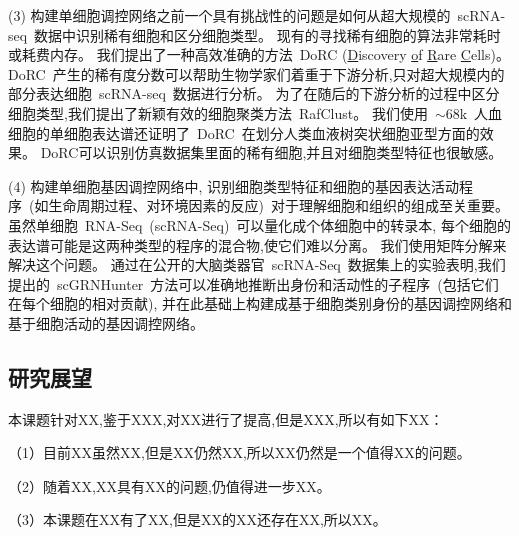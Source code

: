 (3) 构建单细胞调控网络之前一个具有挑战性的问题是如何从超大规模的~scRNA-seq~数据中识别稀有细胞和区分细胞类型。
现有的寻找稀有细胞的算法非常耗时或耗费内存。
我们提出了一种高效准确的方法~DoRC (\underline{D}iscovery \underline{o}f \underline{R}are \underline{C}ells)。
DoRC~产生的稀有度分数可以帮助生物学家们着重于下游分析,只对超大规模内的部分表达细胞~scRNA-seq~数据进行分析。
为了在随后的下游分析的过程中区分细胞类型,我们提出了新颖有效的细胞聚类方法~RafClust。
我们使用~${\sim}68$k~人血细胞的单细胞表达谱还证明了~DoRC~在划分人类血液树突状细胞亚型方面的效果。
DoRC可以识别仿真数据集里面的稀有细胞,并且对细胞类型特征也很敏感。

(4) 构建单细胞基因调控网络中, 识别细胞类型特征和细胞的基因表达活动程序~(如生命周期过程、对环境因素的反应)~对于理解细胞和组织的组成至关重要。
虽然单细胞~RNA-Seq~(scRNA-Seq)~可以量化成个体细胞中的转录本,
每个细胞的表达谱可能是这两种类型的程序的混合物,使它们难以分离。
我们使用矩阵分解来解决这个问题。
通过在公开的大脑类器官~scRNA-Seq~数据集上的实验表明,我们提出的~scGRNHunter~方法可以准确地推断出身份和活动性的子程序~(包括它们在每个细胞的相对贡献), 
并在此基础上构建成基于细胞类别身份的基因调控网络和基于细胞活动的基因调控网络。

\subsection{研究展望}
本课题针对XX,鉴于XXX,对XX进行了提高,但是XXX,所以有如下XX：

（1）目前XX虽然XX,但是XX仍然XX,所以XX仍然是一个值得XX的问题。

（2）随着XX,XX具有XX的问题,仍值得进一步XX。

（3）本课题在XX有了XX,但是XX的XX还存在XX,所以XX。